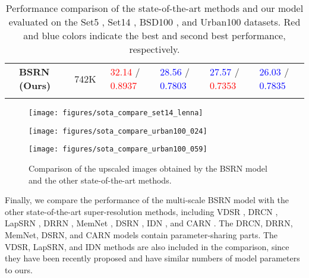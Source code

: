 \documentclass[runningheads]{llncs}
\begin{document}
\begin{table*}[t!]
\begin{center}
\begin{tabular}{c l r l l l l}
			& \textbf{BSRN (Ours)} & 742K~ & \textcolor{red}{32.14} / \textcolor{red}{0.8937} & \textcolor{blue}{28.56} / \textcolor{blue}{0.7803} & \textcolor{blue}{27.57} / \textcolor{red}{0.7353} & \textcolor{blue}{26.03} / \textcolor{blue}{0.7835} \\
			\noalign{\smallskip}
			\hline
			\noalign{\smallskip}
		\end{tabular}
	\end{center}
	\caption{Performance comparison of the state-of-the-art methods and our model evaluated on the Set5 \cite{bevilacqua2012low}, Set14 \cite{zeyde2010single}, BSD100 \cite{martin2001database}, and Urban100 \cite{huang2015single} datasets. Red and blue colors indicate the best and second best performance, respectively.}
	\label{table:performance_comparison}
\end{table*}

\begin{figure*}[t!]
\begin{center}
	\centering
	\begin{minipage}[b]{0.995\linewidth}
		\centering
		\centerline{\texttt{[image: figures/sota\_compare\_set14\_lenna]}}
		\vspace{0.08in}
	\end{minipage}
	\begin{minipage}[b]{0.995\linewidth}
		\centering
		\centerline{\texttt{[image: figures/sota\_compare\_urban100\_024]}}
		\vspace{0.08in}
	\end{minipage}
	\begin{minipage}[b]{0.995\linewidth}
		\centering
		\centerline{\texttt{[image: figures/sota\_compare\_urban100\_059]}}
	\end{minipage}
\end{center}
\caption{Comparison of the upscaled images obtained by the BSRN model and the other state-of-the-art methods.}
\label{fig:sota_vs_bsrn}
\end{figure*}

Finally, we compare the performance of the multi-scale BSRN model with the other state-of-the-art super-resolution methods, including VDSR \cite{kim2016accurate}, DRCN \cite{kim2016deeply}, LapSRN \cite{lai2017deep}, DRRN \cite{tai2017image}, MemNet \cite{tai2017memnet}, DSRN \cite{han2018image}, IDN \cite{hui2018fast}, and CARN \cite{ahn2018fast}.
The DRCN, DRRN, MemNet, DSRN, and CARN models contain parameter-sharing parts.
The VDSR, LapSRN, and IDN methods are also included in the comparison, since they have been recently proposed and have similar numbers of model parameters to ours.
\end{document}
